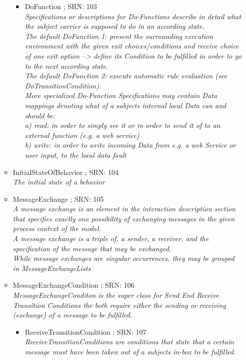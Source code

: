 \begin{itemize}
\begin{itemize}
\begin{itemize}
\begin{itemize}
				\end{itemize}
				\item DoFunction ; SRN: 103 \\ \textit{Specifications or descriptions for Do-Functions describe in detail what the subject carrier is supposed to do in an according state.\\
					The default DoFunction 1: present the surrounding execution environment with the given exit choices/conditions and receive choice of one exit option --> define its Condition to be fulfilled in order to go to the next according state.\\
					The default DoFunction 2: execute automatic rule evaluation (see DoTransitionCondition).\\
					More specialized Do-Function Specifications may contain Data mappings denoting what of a subjects internal local Data can and should be:\\
					a) read: in order to simply see it or in order to send it of to an external function (e.g. a web service)\\
					b) write: in order to write incoming Data from e.g. a web Service or user input, to the local data fault}
			\end{itemize}
			\item InitialStateOfBehavior ; SRN: 104 \\ \textit{The initial state of a behavior}
			\item MessageExchange ; SRN: 105 \\ \textit{A message exchange is an element in the interaction description section that specifies exactly one possibility of exchanging messages in the given process context of the model.\\
				A message exchange is a triple of, a sender, a receiver, and the specification of the message that may be exchanged.\\
				While message exchanges are singular occurrences, they may be grouped in MessageExchangeLists}
			\item MessageExchangeCondition ; SRN: 106 \\ \textit{MessageExchangeConditon is the super class for Send End Receive Transition Conditions the both require either the sending or receiving (exchange) of a message to be fulfilled.}
			\begin{itemize}
				\item ReceiveTransitionCondition ; SRN: 107 \\ \textit{ReceiveTransitionConditions are conditions that state that a certain message must have been taken out of a subjects in-box to be fulfilled.\\
}
\end{itemize}
\end{itemize}
\end{itemize}
